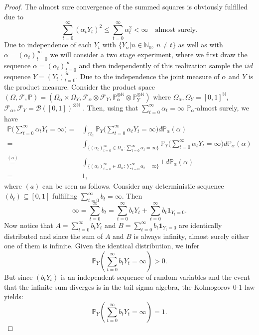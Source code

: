 \documentclass{article}
\newcommand{\cB}{\mathcal{B}}
\newcommand{\cF}{\mathcal{F}}
\newcommand{\N}{\mathbb{N}}
\theoremstyle{plain}
\theoremstyle{definition}
\theoremstyle{remark}
\begin{document}
\begin{proof}
    The almost sure convergence of the summed squares is obviously fulfilled due to 
    \[\sum_{t=0}^\infty(\alpha_tY_t)^2\leq\sum_{t=0}^\infty \alpha_t^2<\infty\quad \text{almost surely.}\]
    Due to independence of each $Y_t$ with $\{Y_n|n\in\N_0,\ n\neq t\}$ as well as with $\alpha=(\alpha_t)_{t=0}^\infty$ we will consider a two stage experiment, where we first draw the sequence $\alpha=(\alpha_t)_{t=0}^\infty$ and then independently of this realization sample the $iid$ sequence $Y=(Y_t)_{t=0}^\infty$. Due to the independence the joint measure of $\alpha$ and $Y$ is the product measure. Consider the product space $(\Omega,\cF,\mathbb P)=(\Omega_\alpha\times\Omega_Y,\cF_\alpha\otimes\cF_Y,\mathbb P^{\otimes\N}_\alpha\otimes\mathbb P^{\otimes\N}_Y)$ where $\Omega_\alpha,\Omega_Y=[0,1]^\N$, $\cF_\alpha,\cF_Y=\cB([0,1])^{\otimes \N}$ . Then, using that $\sum_{t=0}^\infty\alpha_t=\infty$ $\mathbb P_\alpha$-almost surely, we have
    \begin{align*}   
    \mathbb P\Big(\sum_{t=0}^\infty\alpha_tY_t=\infty\Big)
    =&\int_{\Omega_\alpha}
    \mathbb P_Y\Big(\sum_{t=0}^\infty\alpha_tY_t=\infty\Big)
    d\mathbb P_\alpha(\alpha)\\
            =&\int_{\{(\alpha_t)_{t=0}^\infty\in \Omega_\alpha:\sum_{t=0}^\infty\alpha_t=\infty\}}\mathbb P_Y\Big(\sum_{t=0}^\infty\alpha_tY_t=\infty\Big)d\mathbb P_\alpha(\alpha)\\
            \overset{(a)}{=}&\int_{\{(\alpha_t)_{t=0}^\infty\in \Omega_\alpha:\sum_{t=0}^\infty\alpha_t=\infty\}}1\ d\mathbb P_\alpha(\alpha)\\
            =& 1,
    \end{align*} 
    where $(a)$ can be seen as follows. Consider any deterministic sequence $(b_t)\subseteq[0,1]$ fulfilling $\sum_{t=0}^\infty b_t=\infty$. Then
    \[\infty= \sum_{t=0}^\infty b_t=\sum_{t=0}^\infty b_tY_t+\sum_{t=0}^\infty b_t\textbf{1}_{Y_t=0}.\]
    Now notice that $A=\sum_{t=0}^\infty b_tY_t$ and $B=\sum_{t=0}^\infty b_t\textbf{1}_{Y_t=0}$ are identically distributed and since the sum of $A$ and $B$ is always infinity, almost surely either one of them is infinite. Given the identical distribution, we infer
    \[\mathbb P_Y(\sum_{t=0}^\infty b_tY_t=\infty)>0.\]
    But since $(b_tY_t)$ is an independent sequence of random variables and the event that the infinite sum diverges is in the tail sigma algebra, the Kolmogorov 0-1 law yields:
    \[\mathbb P_Y(\sum_{t=0}^\infty b_tY_t=\infty)=1.\]
\end{proof}
\end{document}
